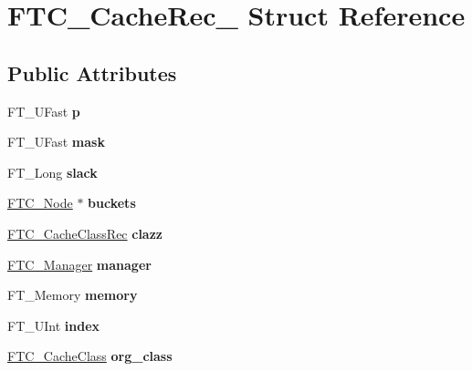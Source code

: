 \hypertarget{struct_f_t_c___cache_rec__}{}\section{F\+T\+C\+\_\+\+Cache\+Rec\+\_\+ Struct Reference}
\label{struct_f_t_c___cache_rec__}
\subsection*{Public Attributes}
\begin{DoxyCompactItemize}
\item 
\mbox{\label{struct_f_t_c___cache_rec___a205c7df4d202f5061b819a51930b5a1f}} 
F\+T\+\_\+\+U\+Fast {\bfseries p}
\item 
\mbox{\label{struct_f_t_c___cache_rec___aca20340deffda70ee03e5538a222657b}} 
F\+T\+\_\+\+U\+Fast {\bfseries mask}
\item 
\mbox{\label{struct_f_t_c___cache_rec___a5325ff0ab8b2f9c06e9379834b9813ef}} 
F\+T\+\_\+\+Long {\bfseries slack}
\item 
\mbox{\label{struct_f_t_c___cache_rec___ae1203a745e309bf6245abe162eb5b882}} 
\hyperlink{struct_f_t_c___node_rec__}{F\+T\+C\+\_\+\+Node} $\ast$ {\bfseries buckets}
\item 
\mbox{\label{struct_f_t_c___cache_rec___a35a9078d3c1300e150922c66233268d5}} 
\hyperlink{struct_f_t_c___cache_class_rec__}{F\+T\+C\+\_\+\+Cache\+Class\+Rec} {\bfseries clazz}
\item 
\mbox{\label{struct_f_t_c___cache_rec___aec65ef3c6235023c6caa74ceb41d2d3f}} 
\hyperlink{struct_f_t_c___manager_rec__}{F\+T\+C\+\_\+\+Manager} {\bfseries manager}
\item 
\mbox{\label{struct_f_t_c___cache_rec___a2765f249e995da02dc9f01edcaee9b0d}} 
F\+T\+\_\+\+Memory {\bfseries memory}
\item 
\mbox{\label{struct_f_t_c___cache_rec___a14be310ca9fada54a2ea9997186fd30e}} 
F\+T\+\_\+\+U\+Int {\bfseries index}
\item 
\mbox{\label{struct_f_t_c___cache_rec___a35e388c8e391a2bbe4ff6b0f19386f6e}} 
\hyperlink{struct_f_t_c___cache_class_rec__}{F\+T\+C\+\_\+\+Cache\+Class} {\bfseries org\+\_\+class}
\end{DoxyCompactItemize}


